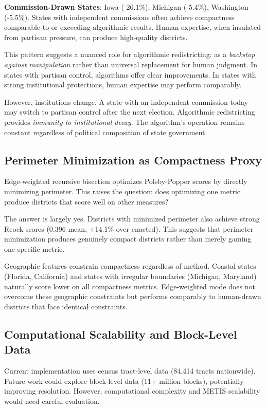 \textbf{Commission-Drawn States}: Iowa (-26.1\%), Michigan (-5.4\%), Washington (-5.5\%). States with independent commissions often achieve compactness comparable to or exceeding algorithmic results. Human expertise, when insulated from partisan pressure, can produce high-quality districts.

This pattern suggests a nuanced role for algorithmic redistricting: as a \textit{backstop against manipulation} rather than universal replacement for human judgment. In states with partisan control, algorithms offer clear improvements. In states with strong institutional protections, human expertise may perform comparably.

However, institutions change. A state with an independent commission today may switch to partisan control after the next election. Algorithmic redistricting provides \textit{immunity to institutional decay}. The algorithm's operation remains constant regardless of political composition of state government.

\subsection{Perimeter Minimization as Compactness Proxy}

Edge-weighted recursive bisection optimizes Polsby-Popper scores by directly minimizing perimeter. This raises the question: does optimizing one metric produce districts that score well on other measures?

The answer is largely yes. Districts with minimized perimeter also achieve strong Reock scores (0.396 mean, +14.1\% over enacted). This suggests that perimeter minimization produces genuinely compact districts rather than merely gaming one specific metric.

Geographic features constrain compactness regardless of method. Coastal states (Florida, California) and states with irregular boundaries (Michigan, Maryland) naturally score lower on all compactness metrics. Edge-weighted mode does not overcome these geographic constraints but performs comparably to human-drawn districts that face identical constraints.

\subsection{Computational Scalability and Block-Level Data}

Current implementation uses census tract-level data (84,414 tracts nationwide). Future work could explore block-level data (11+ million blocks), potentially improving resolution. However, computational complexity and METIS scalability would need careful evaluation.

